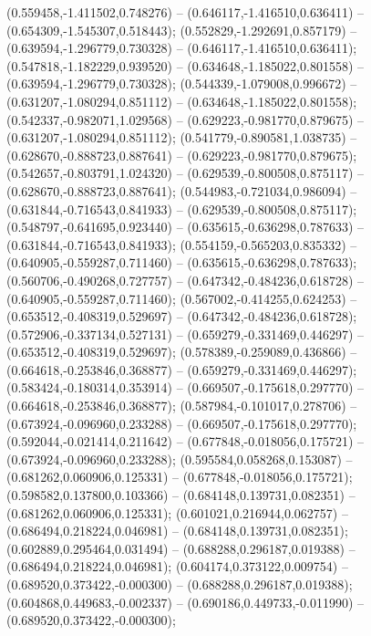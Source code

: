  (0.559458,-1.411502,0.748276) -- (0.646117,-1.416510,0.636411) -- (0.654309,-1.545307,0.518443);
 (0.552829,-1.292691,0.857179) -- (0.639594,-1.296779,0.730328) -- (0.646117,-1.416510,0.636411);
 (0.547818,-1.182229,0.939520) -- (0.634648,-1.185022,0.801558) -- (0.639594,-1.296779,0.730328);
 (0.544339,-1.079008,0.996672) -- (0.631207,-1.080294,0.851112) -- (0.634648,-1.185022,0.801558);
 (0.542337,-0.982071,1.029568) -- (0.629223,-0.981770,0.879675) -- (0.631207,-1.080294,0.851112);
 (0.541779,-0.890581,1.038735) -- (0.628670,-0.888723,0.887641) -- (0.629223,-0.981770,0.879675);
 (0.542657,-0.803791,1.024320) -- (0.629539,-0.800508,0.875117) -- (0.628670,-0.888723,0.887641);
 (0.544983,-0.721034,0.986094) -- (0.631844,-0.716543,0.841933) -- (0.629539,-0.800508,0.875117);
 (0.548797,-0.641695,0.923440) -- (0.635615,-0.636298,0.787633) -- (0.631844,-0.716543,0.841933);
 (0.554159,-0.565203,0.835332) -- (0.640905,-0.559287,0.711460) -- (0.635615,-0.636298,0.787633);
 (0.560706,-0.490268,0.727757) -- (0.647342,-0.484236,0.618728) -- (0.640905,-0.559287,0.711460);
 (0.567002,-0.414255,0.624253) -- (0.653512,-0.408319,0.529697) -- (0.647342,-0.484236,0.618728);
 (0.572906,-0.337134,0.527131) -- (0.659279,-0.331469,0.446297) -- (0.653512,-0.408319,0.529697);
 (0.578389,-0.259089,0.436866) -- (0.664618,-0.253846,0.368877) -- (0.659279,-0.331469,0.446297);
 (0.583424,-0.180314,0.353914) -- (0.669507,-0.175618,0.297770) -- (0.664618,-0.253846,0.368877);
 (0.587984,-0.101017,0.278706) -- (0.673924,-0.096960,0.233288) -- (0.669507,-0.175618,0.297770);
 (0.592044,-0.021414,0.211642) -- (0.677848,-0.018056,0.175721) -- (0.673924,-0.096960,0.233288);
 (0.595584,0.058268,0.153087) -- (0.681262,0.060906,0.125331) -- (0.677848,-0.018056,0.175721);
 (0.598582,0.137800,0.103366) -- (0.684148,0.139731,0.082351) -- (0.681262,0.060906,0.125331);
 (0.601021,0.216944,0.062757) -- (0.686494,0.218224,0.046981) -- (0.684148,0.139731,0.082351);
 (0.602889,0.295464,0.031494) -- (0.688288,0.296187,0.019388) -- (0.686494,0.218224,0.046981);
 (0.604174,0.373122,0.009754) -- (0.689520,0.373422,-0.000300) -- (0.688288,0.296187,0.019388);
 (0.604868,0.449683,-0.002337) -- (0.690186,0.449733,-0.011990) -- (0.689520,0.373422,-0.000300);

